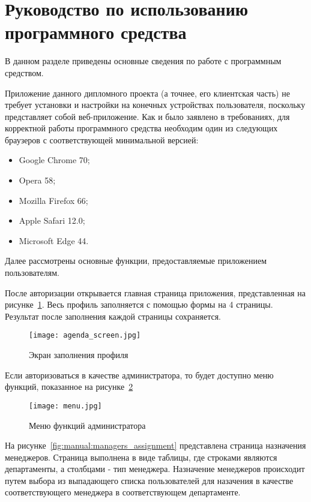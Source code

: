 \section{Руководство по использованию программного средства}
\label{sec:manual}

В данном разделе приведены основные сведения по работе с программным средством.

Приложение данного дипломного проекта (а точнее, его клиентская часть) не требует установки и настройки на
конечных устройствах пользователя, поскольку представляет собой веб-приложение. Как и было заявлено в требованиях,
для корректной работы программного средства необходим один из следующих браузеров с соответствующей минимальной версией:

\begin{itemize}
	\item Google Chrome 70;
	\item Opera 58;
	\item Mozilla Firefox 66;
	\item Apple Safari 12.0;
	\item Microsoft Edge 44.
\end{itemize}

Далее рассмотрены основные функции, предоставляемые приложением пользователям.

После авторизации открывается главная страница приложения, представленная на рисунке~\ref{fig:manual:agenda_screen}.
Весь профиль заполняется с помощью формы на 4 страницы. Результат после заполнения каждой страницы сохраняется.

\begin{figure}[ht]
  \centering
    \texttt{[image: agenda\_screen.jpg]}
    \caption{Экран заполнения профиля}
    \label{fig:manual:agenda_screen}
\end{figure}
  
Если авторизоваться в качестве администратора, то будет доступно меню функций, показанное на
рисунке~\ref{fig:manual:menu}

\begin{figure}[ht]
  \centering
    \texttt{[image: menu.jpg]}
    \caption{Меню функций администратора}
    \label{fig:manual:menu}
\end{figure}
  
На рисунке~\ref{fig:manual:managers_assignment} представлена страница назначения менеджеров. Страница выполнена в виде
таблицы, где строками являются департаменты, а столбцами - тип менеджера. Назначение менеджеров происходит путем выбора
из выпадающего списка пользователей для назачения в качестве соответствующего менеджера в соответствующем департаменте.

